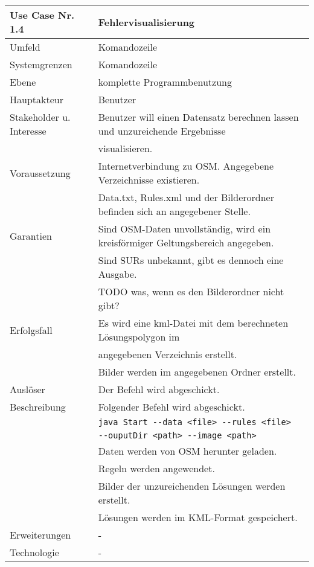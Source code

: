 \begin{tabular}{| l | l |}
 \hline
 \textbf{Use Case Nr. 1.4} & Fehlervisualisierung\\
 \hline
 Umfeld & Komandozeile\\
 \hline
 Systemgrenzen & Komandozeile\\
 \hline
 Ebene & komplette Programmbenutzung\\
 \hline
 Hauptakteur & Benutzer\\
 \hline
 Stakeholder u. Interesse & Benutzer will einen Datensatz berechnen lassen und unzureichende Ergebnisse\\
			  & visualisieren.\\
 \hline
 Voraussetzung & Internetverbindung zu OSM. Angegebene Verzeichnisse existieren.\\
	      & Data.txt, Rules.xml und der Bilderordner befinden sich an angegebener Stelle. \\
 \hline
 Garantien & Sind OSM-Daten unvollständig, wird ein kreisförmiger Geltungsbereich angegeben.\\
	  & Sind SURs unbekannt, gibt es dennoch eine Ausgabe.\\
	  & TODO was, wenn es den Bilderordner nicht gibt?\\
 \hline
 Erfolgsfall & Es wird eine kml-Datei mit dem berechneten Lösungspolygon im\\
	    & angegebenen Verzeichnis erstellt.\\
	    & Bilder werden im angegebenen Ordner erstellt.\\
 \hline
 Auslöser & Der Befehl wird abgeschickt.\\
 \hline
 Beschreibung & Folgender Befehl wird abgeschickt.\\
	    & \verb|java Start --data <file> --rules <file>|\\
	    & \hspace{24pt} \verb|--ouputDir <path> --image <path>|\\
	    & Daten werden von OSM herunter geladen.\\
	    & Regeln werden angewendet.\\
	    & Bilder der unzureichenden Lösungen werden erstellt.\\
	    & Lösungen werden im KML-Format gespeichert.\\
 \hline
 Erweiterungen & -\\
 \hline
 Technologie & -\\
 \hline
\end{tabular}
\\[12pt]
